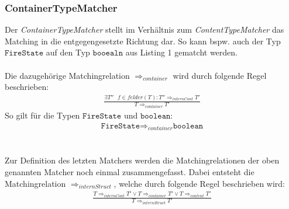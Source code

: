 \subsubsection{ContainerTypeMatcher}
Der \emph{ContainerTypeMatcher} stellt im Verhältnis zum \emph{ContentTypeMatcher} das Matching in die entgegengesetzte Richtung dar. So kann bspw. auch der Typ $\texttt{FireState}$ auf den Typ $\texttt{booealn}$ aus Listing 1 gematcht werden.
\\\\
Die dazugehörige Matchingrelation $\Rightarrow_{container}$ wird durch folgende Regel beschrieben:
\begin{gather*}
\frac{\exists \mathit{T''\text{ }f}\in felder(T): T'' \Rightarrow_{internCont} T'}{T \Rightarrow_{container} T'}
\end{gather*}
\noindent
So gilt für die Typen $\texttt{FireState}$ und $\texttt{boolean}$: 
\begin{gather*}
\texttt{FireState} \Rightarrow_{container} \texttt{boolean}
\end{gather*}
\\\\
Zur Definition des letzten Matchers werden die Matchingrelationen der oben genannten Matcher noch einmal zusammengefasst. Dabei entsteht die Matchingrelation $\Rightarrow_{internStruct}$, welche durch folgende Regel beschrieben wird:
\begin{gather*}
\frac{T \Rightarrow_{internCont}T' \vee T \Rightarrow_{container} T' \vee T \Rightarrow_{content} T'}{T \Rightarrow_{internStruct}T'}
\end{gather*}
